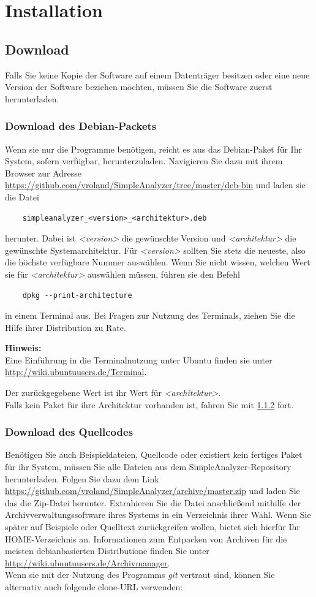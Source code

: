 \documentclass[10pt,a5paper,twoside,titlepage]{scrartcl}
\newenvironment{myshaded}
  {\def\FrameCommand{\colorbox{shadecolor}}
    \MakeFramed {\advance\hsize-\width \FrameRestore}}
 {\endMakeFramed}
\newenvironment{hinweis}
  {\colorlet{shadecolor}{black!20}%
      \begin{myshaded}
      \begin{minipage}{\linewidth}
	  \hangindent 20pt  
      \textbf{Hinweis:}\\
      }
  {\end{minipage}\end{myshaded}}
\def\pkname{SimpleAnalyzer}
\begin{document}
	\section{Installation}
	\subsection{Download}
	Falls Sie keine Kopie der Software auf einem Datenträger besitzen oder eine neue Version der Software beziehen möchten,
	müssen Sie die Software zuerst herunterladen.
	\subsubsection{Download des Debian-Packets}
	\label{subsec:deb_download}
	Wenn sie nur die Programme benötigen, reicht es aus das Debian-Paket für Ihr System, sofern verfügbar, herunterzuladen. Navigieren Sie dazu mit ihrem Browser zur Adresse \url{https://github.com/vroland/SimpleAnalyzer/tree/master/deb-bin} und laden sie die Datei
	\begin{lstlisting}
	simpleanalyzer_<version>_<architektur>.deb
	\end{lstlisting}
	herunter. Dabei ist \emph{<version>} die gewünschte Version und \emph{<architektur>} die gewünschte Systemarchitektur.
	Für \emph{<version>} sollten Sie stets die neueste, also die höchste verfügbare Nummer auswählen.
	Wenn Sie nicht wissen, welchen Wert sie für \emph{<architektur>} auswählen müssen, führen sie den Befehl 
	\begin{lstlisting}
	dpkg --print-architecture	
	\end{lstlisting}
	in einem Terminal aus. Bei Fragen zur Nutzung des Terminals, ziehen Sie die Hilfe ihrer Distribution zu Rate.
\begin{hinweis}
	 Eine Einführung in die Terminalnutzung unter Ubuntu finden sie unter  \url{http://wiki.ubuntuusers.de/Terminal}.
	\end{hinweis}
	 Der zurückgegebene Wert ist ihr Wert für \emph{<architektur>}.\\
	Falls kein Paket für ihre Architektur vorhanden ist, fahren Sie mit
	\ref{subsec:download_code} fort.
	\subsubsection{Download des Quellcodes}
	\label{subsec:download_code}
	Benötigen Sie auch Beispieldateien, Quellcode oder existiert kein fertiges Paket für ihr System, müssen Sie alle Dateien aus dem \pkname-Repository herunterladen. Folgen Sie dazu dem Link	\url{https://github.com/vroland/SimpleAnalyzer/archive/master.zip}
	und laden Sie das die Zip-Datei herunter. Extrahieren Sie die Datei anschließend mithilfe der Archivverwaltungssoftware ihres Systems in ein Verzeichnis ihrer Wahl. Wenn Sie später auf Beispiele oder Quelltext zurückgreifen wollen, bietet sich hierfür Ihr HOME-Verzeichnis an. Informationen zum Entpacken von Archiven für die meisten debianbasierten Distributione finden Sie unter \url{http://wiki.ubuntuusers.de/Archivmanager}.\\
	Wenn sie mit der Nutzung des Programms \emph{git} vertraut sind, können Sie alternativ auch folgende clone-URL verwenden:\\
	
\end{document}
